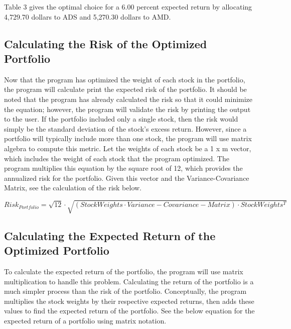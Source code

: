\documentclass[12pt,english]{article}
\begin{document}
\begin{doublespace}
            \indent{}
            Table 3 gives the optimal choice for a 6.00 percent expected return by allocating 4,729.70 dollars to ADS and 5,270.30 dollars to AMD.
                
        \subsection{Calculating the Risk of the Optimized Portfolio}
            
            \indent{}\indent{}
            Now that the program has optimized the weight of each stock in the portfolio, the program will calculate print the expected risk of the portfolio. It should be noted that the program has already calculated the risk so that it could minimize the equation; however, the program will validate the risk by printing the output to the user. If the portfolio included only a single stock, then the risk would simply be the standard deviation of the stock’s excess return. However, since a portfolio will typically include more than one stock, the program will use matrix algebra to compute this metric. Let the weights of each stock be a 1 x m vector, which includes the weight of each stock that the program optimized. The program multiplies this equation by the square root of 12, which provides the annualized risk for the portfolio. Given this vector and the Variance-Covariance Matrix, see the calculation of the risk below.
            
                \begin{center}
                    \begin{equation} \label{Portfolio Risk}
                        Risk_{Portfolio} = 
                        \sqrt{12} \cdot \sqrt{(StockWeights \cdot Variance-Covariance-Matrix) \cdot StockWeights^{T}}
                    \end{equation}
                \end{center}
        
        \subsection{Calculating the Expected Return of the Optimized Portfolio} 

            \indent{}\indent{}
            To calculate the expected return of the portfolio, the program will use matrix multiplication to handle this problem. Calculating the return of the portfolio is a much simpler process than the risk of the portfolio. Conceptually, the program multiplies the stock weights by their respective expected returns, then adds these values to find the expected return of the portfolio. See the below equation for the expected return of a portfolio using matrix notation.
            	

\end{doublespace}
\end{document}
